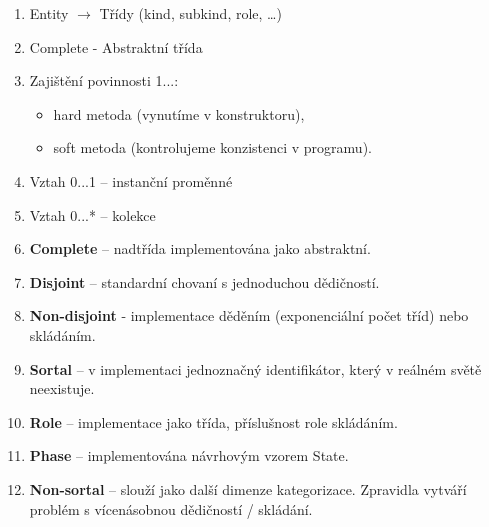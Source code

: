 \documentclass{szzclass}
\begin{document}
\begin{enumerate}
\item Entity $\to$ Třídy (kind, subkind, role, \dots)
\item Complete - Abstraktní třída
\item Zajištění povinnosti 1...:
  \begin{itemize}
  \item hard metoda (vynutíme v konstruktoru),
  \item soft metoda (kontrolujeme konzistenci v programu).
  \end{itemize}
\item Vztah 0...1 – instanční proměnné
\item Vztah 0...* – kolekce
\item \textbf{Complete} – nadtřída implementována jako abstraktní.
\item \textbf{Disjoint} – standardní chovaní s jednoduchou dědičností.
\item \textbf{Non-disjoint} - implementace děděním (exponenciální počet tříd) nebo skládáním.
\item \textbf{Sortal} – v implementaci jednoznačný identifikátor, který v reálném světě neexistuje.
\item \textbf{Role} – implementace jako třída, příslušnost role skládáním.
\item \textbf{Phase} – implementována návrhovým vzorem State.
\item \textbf{Non-sortal} – slouží jako další dimenze kategorizace. Zpravidla vytváří problém s vícenásobnou dědičností / skládání.
\end{enumerate}
\end{document}
